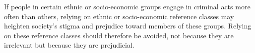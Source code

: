 \documentclass{article}
\begin{document}
 If people in certain ethnic or socio-economic groups engage in criminal acts more often than others, relying on ethnic or socio-economic reference classes may heighten society's stigma and  prejudice toward members of these groups. 
 Relying on these reference classes should therefore be avoided, not because they are irrelevant but because they are prejudicial. 
\end{document}
